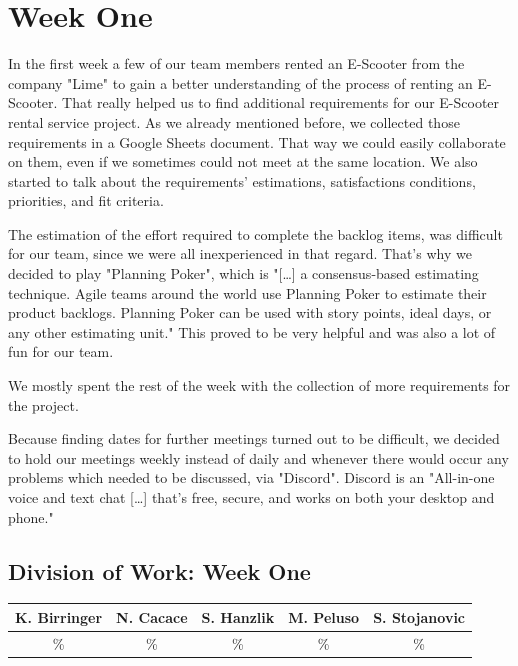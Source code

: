 \documentclass[a4paper, 12pt]{article}
\begin{document}
\section{Week One}
In the first week a few of our team members rented an E-Scooter from the company "Lime" to gain a better understanding of the process of renting an E-Scooter. That really helped us to find additional requirements for our E-Scooter rental service project. As we already mentioned before, we collected those requirements in a Google Sheets document. That way we could easily collaborate on them, even if we sometimes could not meet at the same location. We also started to talk about the requirements' estimations, satisfactions conditions, priorities, and fit criteria.

The estimation of the effort required to complete the backlog items, was difficult for our team, since we were all inexperienced in that regard. That's why we decided to play "Planning Poker", which is "[\ldots] a consensus-based estimating technique. Agile teams around the world use Planning Poker to estimate their product backlogs. Planning Poker can be used with story points, ideal days, or any other estimating unit." \cite{planning-poker} This proved to be very helpful and was also a lot of fun for our team.


We mostly spent the rest of the week with the collection of more requirements for the project.

Because finding dates for further meetings turned out to be difficult, we decided to hold our meetings weekly instead of daily and whenever there would occur any problems which needed to be discussed, via "Discord". Discord is an "All-in-one voice and text chat [\ldots] that's free, secure, and works on both your desktop and phone."\cite{discord}

\subsection{Division of Work: Week One}
\begin{table}[htbp]
\centering
\setlength{\tabcolsep}{10pt}
\begin{tabular}{|c|c|c|c|c|}
\hline
K. Birringer & N. Cacace & S. Hanzlik & M. Peluso & S. Stojanovic\\
\hline
\% & \% & \% & \% & \% \\ 
\hline
\end{tabular}
\end{table}
\end{document}
